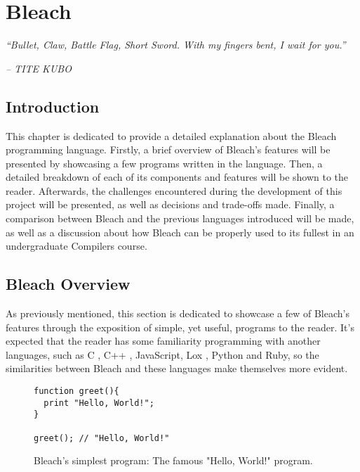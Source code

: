 \chapter{Bleach} \label{cap:metodologia}

\begin{displayquote}
    \begin{center}
        \textit{``Bullet, Claw, Battle Flag, Short Sword. With my fingers bent, I wait for you.''}
    \end{center}
\end{displayquote}

\begin{flushright}
   \textit{-- TITE KUBO}
\end{flushright}

\section{Introduction}
This chapter is dedicated to provide a detailed explanation about the Bleach programming language. Firstly, a brief overview of Bleach's features will be presented by showcasing a few programs written in the language. Then, a detailed breakdown of each of its components and features will be shown to the reader. Afterwards, the challenges encountered during the development of this project will be presented, as well as decisions and trade-offs made. Finally, a comparison between Bleach and the previous languages introduced will be made, as well as a discussion about how Bleach can be properly used to its fullest in an undergraduate Compilers course.

\section{Bleach Overview}
As previously mentioned, this section is dedicated to showcase a few of Bleach's features through the exposition of simple, yet useful, programs to the reader. It's expected that the reader has some familiarity programming with another languages, such as C \cite{kernighan1988c}, C++ \cite{strousrup2000c++}, JavaScript, Lox \cite{nystrom2021crafting}, Python \cite{python_language} and Ruby, so the similarities between Bleach and these languages make themselves more evident. \newline

\begin{figure}
    \centering
    \begin{lstlisting}
function greet(){
  print "Hello, World!";
}

greet(); // "Hello, World!"
    \end{lstlisting}
    \caption{Bleach's simplest program: The famous "Hello, World!" program.}
\end{figure}

